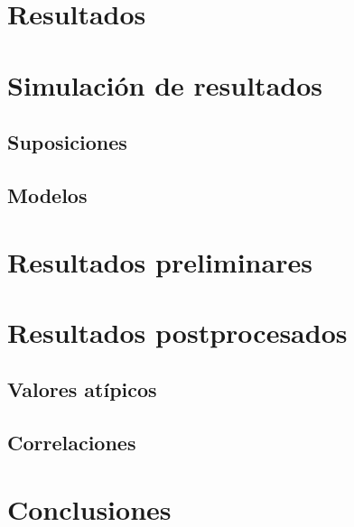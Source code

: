\documentclass[12pt,a4paper]{article}
\begin{document}
\section{Resultados}
\section{Simulación de resultados}
\subsection{Suposiciones}
\subsection{Modelos}
\section{Resultados preliminares}
\section{Resultados postprocesados}
\subsection{Valores atípicos}
\subsection{Correlaciones}
\section{Conclusiones}
\end{document}
